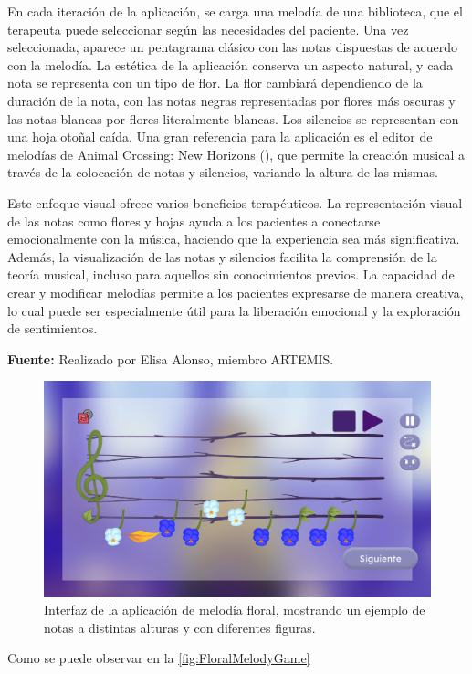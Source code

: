 En cada iteración de la aplicación, se carga una melodía de una biblioteca, que el terapeuta puede seleccionar según las necesidades del paciente. Una vez seleccionada, aparece un pentagrama clásico con las notas dispuestas de acuerdo con la melodía. La estética de la aplicación conserva un aspecto natural, y cada nota se representa con un tipo de flor. La flor cambiará dependiendo de la duración de la nota, con las notas negras representadas por flores más oscuras y las notas blancas por flores literalmente blancas. Los silencios se representan con una hoja otoñal caída. Una gran referencia para la aplicación es el editor de melodías de Animal Crossing: New Horizons (\cite{ACNH:2020}), que permite la creación musical a través de la colocación de notas y silencios, variando la altura de las mismas. 

Este enfoque visual ofrece varios beneficios terapéuticos. La representación visual de las notas como flores y hojas ayuda a los pacientes a conectarse emocionalmente con la música, haciendo que la experiencia sea más significativa. Además, la visualización de las notas y silencios facilita la comprensión de la teoría musical, incluso para aquellos sin conocimientos previos. La capacidad de crear y modificar melodías permite a los pacientes expresarse de manera creativa, lo cual puede ser especialmente útil para la liberación emocional y la exploración de sentimientos.

\begin{center}
	\textbf{Fuente:} Realizado por Elisa Alonso, miembro ARTEMIS.
	\vspace{-18pt}
\end{center}

\begin{figure}[h!]
	\centering
	\includegraphics[width=0.8\linewidth]{Figuras/Desarrollo/MelodiaFloralGame.png}
	\caption[Interfaz de la aplicación melodía floral.]{Interfaz de la aplicación de melodía floral, mostrando un ejemplo de notas a distintas alturas y con diferentes figuras.}
	\label{fig:FloralMelodyGame}
\end{figure}

Como se puede observar en la \autoref{fig:FloralMelodyGame}



